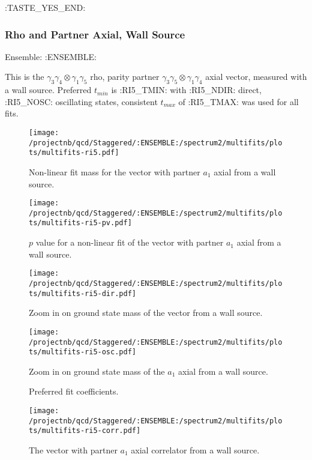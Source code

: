 \clearpage
:TASTE_YES_END:

\subsubsection{Rho and Partner Axial, Wall Source}

Ensemble: :ENSEMBLE:

This is the $\gamma_3 \gamma_4 \otimes \gamma_1 \gamma_5$ rho, parity partner $\gamma_3 \gamma_5 \otimes \gamma_1 \gamma_4$ axial vector, measured with a wall source. Preferred $t_{min}$ is :RI5_TMIN: with :RI5_NDIR: direct, :RI5_NOSC: oscillating states, consistent $t_{max}$ of :RI5_TMAX: was used for all fits.


\begin{multicols}{2}
\begin{figure}[H]
\centering
\texttt{[image: /projectnb/qcd/Staggered/:ENSEMBLE:/spectrum2/multifits/plots/multifits-ri5.pdf]}
\caption{Non-linear fit mass for the vector with partner $a_1$ axial from a wall source.}
\end{figure}
\columnbreak
\begin{figure}[H]
\centering
\texttt{[image: /projectnb/qcd/Staggered/:ENSEMBLE:/spectrum2/multifits/plots/multifits-ri5-pv.pdf]}
\caption{$p$ value for a non-linear fit of the vector with partner $a_1$ axial from a wall source.}
\end{figure}
\end{multicols}

\begin{multicols}{2}
\begin{figure}[H]
\centering
\texttt{[image: /projectnb/qcd/Staggered/:ENSEMBLE:/spectrum2/multifits/plots/multifits-ri5-dir.pdf]}
\caption{Zoom in on ground state mass of the vector from a wall source.}
\end{figure}
\columnbreak
\begin{figure}[H]
\centering
\texttt{[image: /projectnb/qcd/Staggered/:ENSEMBLE:/spectrum2/multifits/plots/multifits-ri5-osc.pdf]}
\caption{Zoom in on ground state mass of the $a_1$ axial from a wall source.}
\end{figure}
\end{multicols}

\begin{multicols}{2}
\begin{figure}[H]
\centering
\scriptsize

\caption{Preferred fit coefficients.}
\end{figure}
\columnbreak
\begin{figure}[H]
\centering
\texttt{[image: /projectnb/qcd/Staggered/:ENSEMBLE:/spectrum2/multifits/plots/multifits-ri5-corr.pdf]}
\caption{The vector with partner $a_1$ axial correlator from a wall source.}
\end{figure}
\end{multicols}

